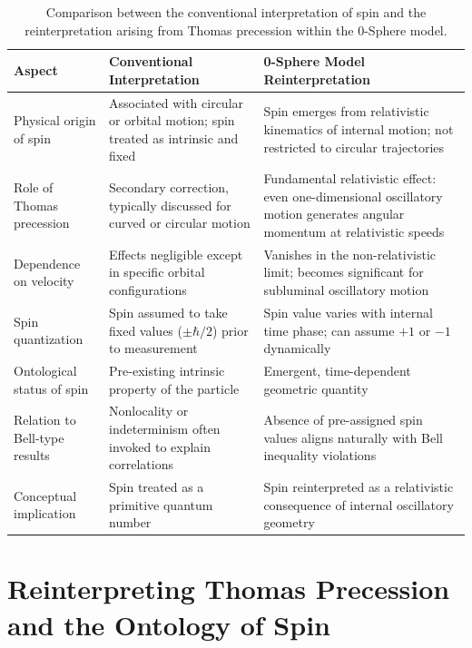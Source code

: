 \documentclass[12pt,letterpaper]{article}
\begin{document}
\begin{table}[h!]
\centering
\renewcommand{\arraystretch}{1.3}
\begin{tabularx}{\textwidth}{l X X}
\toprule
\textbf{Aspect} 
& \textbf{Conventional Interpretation} 
& \textbf{0-Sphere Model Reinterpretation} \\
\midrule
Physical origin of spin 
& Associated with circular or orbital motion; spin treated as intrinsic and fixed 
& Spin emerges from relativistic kinematics of internal motion; not restricted to circular trajectories \\

Role of Thomas precession 
& Secondary correction, typically discussed for curved or circular motion 
& Fundamental relativistic effect: even one-dimensional oscillatory motion generates angular momentum at relativistic speeds \\

Dependence on velocity 
& Effects negligible except in specific orbital configurations 
& Vanishes in the non-relativistic limit; becomes significant for subluminal oscillatory motion \\

Spin quantization 
& Spin assumed to take fixed values ($\pm \hbar/2$) prior to measurement 
& Spin value varies with internal time phase; can assume $+1$ or $-1$ dynamically \\

Ontological status of spin 
& Pre-existing intrinsic property of the particle 
& Emergent, time-dependent geometric quantity \\

Relation to Bell-type results 
& Nonlocality or indeterminism often invoked to explain correlations 
& Absence of pre-assigned spin values aligns naturally with Bell inequality violations \\

Conceptual implication 
& Spin treated as a primitive quantum number 
& Spin reinterpreted as a relativistic consequence of internal oscillatory geometry \\
\bottomrule
\end{tabularx}
\caption{Comparison between the conventional interpretation of spin and the reinterpretation arising from Thomas precession within the 0-Sphere model.}
\label{tab:spin_thomas_comparison}
\end{table}

\section{Reinterpreting Thomas Precession and the Ontology of Spin}
\end{document}

